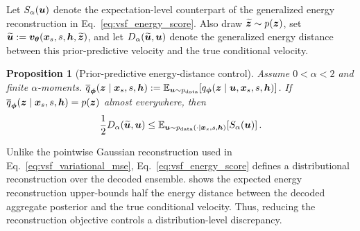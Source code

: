 \documentclass{article} %
\newtheorem{vsfproposition}[vsftheorem]{Proposition}
\numberwithin{equation}{section}
\begin{document}
Let $S_\alpha({\bm{u}})$ denote the
expectation-level counterpart of the generalized energy reconstruction in
Eq.~\ref{eq:vsf_energy_score}. Also draw
$\widetilde{{\bm{z}}}\sim p({\bm{z}})$, set
$\widetilde{{\bm{u}}}:={\bm{v}}_{{\bm{\theta}}}({\bm{x}}_s,s,{\bm{h}},\widetilde{{\bm{z}}})$, and let
$D_\alpha(\widetilde{{\bm{u}}},{\bm{u}})$ denote the generalized energy distance
between this prior-predictive velocity and the true conditional velocity.

\begin{vsfproposition}[Prior-predictive energy-distance control]
\label{prop:energy_control}
Assume $0<\alpha<2$ and finite $\alpha$-moments. \(\overline q_{\boldsymbol{\phi}}({\bm{z}}\mid{\bm{x}}_s,s,{\bm{h}})
    :=
    \mathbb{E}_{{\bm{u}}\sim p_{\mathrm{data}}}
    \!\left[
        q_{\boldsymbol{\phi}}({\bm{z}}\mid{\bm{u}},{\bm{x}}_s,s,{\bm{h}})
    \right]\). If
$\overline q_{\boldsymbol{\phi}}({\bm{z}}\mid{\bm{x}}_s,s,{\bm{h}})=p({\bm{z}})$ almost everywhere,
then
\begin{equation*}
  \frac12D_\alpha(\widetilde{{\bm{u}}},{\bm{u}})
  \leq
  \mathbb{E}_{{\bm{u}}\sim p_{\mathrm{data}}(\cdot\mid{\bm{x}}_s,s,{\bm{h}})}
  \!\left[S_\alpha({\bm{u}})\right].
\end{equation*}
\end{vsfproposition}


Unlike the pointwise Gaussian reconstruction used in Eq.~\ref{eq:vsf_variational_mse}, Eq.~\ref{eq:vsf_energy_score} defines a distributional reconstruction
over the decoded ensemble.  shows the expected energy reconstruction upper-bounds half the energy distance between the decoded aggregate posterior and the true conditional velocity. Thus, reducing the reconstruction objective controls a distribution-level discrepancy.
\end{document}
